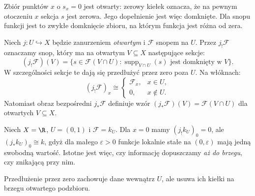 \begin{uwaga}
Zbiór punktów $x$ o $s_x=0$ jest otwarty: zerowy kiełek oznacza,
że na pewnym otoczeniu $x$ sekcja $s$ jest zerowa. Jego dopełnienie
jest więc domknięte. Dla snopu funkcji jest to zwykłe domknięcie
zbioru, na którym funkcja jest różna od zera.
\end{uwaga}

\begin{definicja}
\label{def:jbang-v12}
Niech $j:U\hookrightarrow X$ będzie zanurzeniem \emph{otwartym}
i $\mathcal F$ snopem na $U$. Przez $j_!\mathcal F$ oznaczamy snop,
który ma na otwartym $V\subseteq X$ następujące sekcje:
\[(j_!\mathcal F)(V)=\{s\in\mathcal F(V\cap U):
\operatorname{supp}_{V\cap U}(s)\text{ jest domknięty w }V\}.\]
W szczególności sekcje te dają się przedłużyć przez zero
poza $U$. Na włóknach:
\[
(j_!\mathcal F)_x\cong
\begin{cases}\mathcal F_x,&x\in U,\\0,&x\notin U.\end{cases}
\]
Natomiast obraz bezpośredni $j_*\mathcal F$ definiuje wzór
$(j_*\mathcal F)(V)=\mathcal F(V\cap U)$ dla otwartych $V\subseteq X$.
\end{definicja}

\begin{przyklad}
Niech $X=\R$, $U=(0,1)$ i $\mathcal F=k_U$. Dla $x=0$ mamy
$(j_!k_U)_0=0$, ale $(j_*k_U)_0\cong k$, gdyż dla małego
$\varepsilon>0$ funkcje lokalnie stałe na $(0,\varepsilon)$
mają jedną swobodną wartość. Istotne jest więc, czy
informację dopuszczamy \emph{aż do brzegu}, czy znikającą przy nim.
\end{przyklad}

\begin{center}
\par\smallskip\small Przedłużenie przez zero zachowuje dane wewnątrz $U$,
ale usuwa ich kiełki na brzegu otwartego podzbioru.
\end{center}

